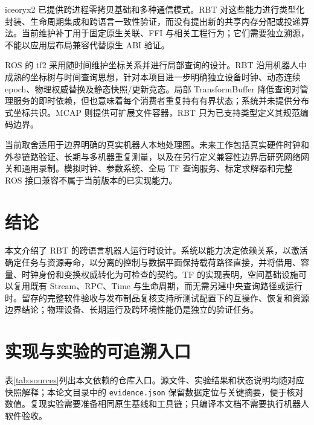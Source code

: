 \documentclass[UTF8,fontset=none,zihao=-4,a4paper]{ctexart}
\newcommand{\code}[1]{\texttt{#1}}
\begin{document}
iceoryx2 已提供跨进程零拷贝基础和多种通信模式\cite{iceoryx2}。RBT 对这些能力进行类型化封装、生命周期集成和跨语言一致性验证，而没有提出新的共享内存分配或投递算法。当前维护补丁用于固定原生关联、FFI 与相关工程行为；它们需要独立溯源，不能以应用层布局兼容代替原生 ABI 验证。

ROS 的 tf2 采用随时间维护坐标关系并进行局部查询的设计\cite{tf2}。RBT 沿用机器人中成熟的坐标树与时间查询思想，针对本项目进一步明确独立设备时钟、动态连续 epoch、物理权威替换及静态快照/更新竞态。局部 TransformBuffer 降低查询对管理服务的即时依赖，但也意味着每个消费者重复持有有界状态；系统并未提供分布式坐标共识。MCAP 则提供可扩展文件容器\cite{mcap}，RBT 只为已支持类型定义其规范编码边界。

当前取舍适用于边界明确的真实机器人本地处理图。未来工作包括真实硬件时钟和外参链路验证、长期与多机器重复测量，以及在另行定义兼容性边界后研究网络网关和通用录制。模拟时钟、参数系统、全局 TF 查询服务、标定求解器和完整 ROS 接口兼容不属于当前版本的已实现能力。

\section{结论}
本文介绍了 RBT 的跨语言机器人运行时设计。系统以能力决定依赖关系，以激活确定任务与资源寿命，以分离的控制与数据平面保持载荷路径直接，并将借用、容量、时钟身份和变换权威转化为可检查的契约。TF 的实现表明，空间基础设施可以复用既有 Stream、RPC、Time 与生命周期，而无需另建中央查询路径或运行时。留存的完整软件验收与发布制品复核支持所测试配置下的互操作、恢复和资源边界结论；物理设备、长期运行及跨环境性能仍是独立的验证任务。

\appendix
\section{实现与实验的可追溯入口}
\label{app:repro}
表\ref{tab:sources}列出本文依赖的仓库入口。源文件、实验结果和状态说明均随对应快照解释；本论文目录中的 \code{evidence.json} 保留数据定位与关键摘要，便于核对数值。复现实验需要准备相同原生基线和工具链；只编译本文档不需要执行机器人软件验收。
\end{document}

